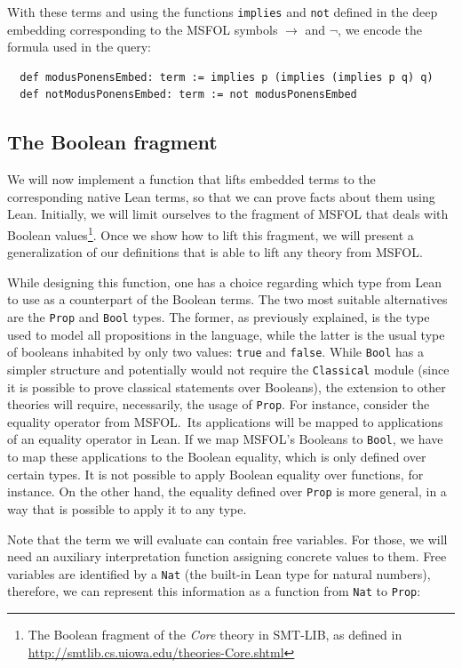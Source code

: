 With these terms and using the functions \texttt{implies} and
\texttt{not} defined in the deep embedding corresponding to the MSFOL symbols
$\rightarrow$ and $\neg$, we encode the formula used in the
query:

\begin{verbatim}
  def modusPonensEmbed: term := implies p (implies (implies p q) q)
  def notModusPonensEmbed: term := not modusPonensEmbed
\end{verbatim}


\subsection{The Boolean fragment}

We will now implement a function that lifts embedded terms to the corresponding
native Lean terms, so that we can prove facts about them using Lean.
Initially, we will limit ourselves to the fragment of MSFOL that
deals with Boolean values\footnote{The Boolean fragment of the
\emph{Core} theory in SMT-LIB, as defined in
\url{http://smtlib.cs.uiowa.edu/theories-Core.shtml}}. Once
we show how to lift this fragment, we will present a generalization
of our definitions that is able to lift any theory from MSFOL.

While designing this function, one has a
choice regarding which type from Lean to use as a counterpart of the Boolean terms. The two
most suitable alternatives are the \texttt{Prop} and \texttt{Bool} types. The former, as
previously explained, is the type used to model all propositions in the language, while
the latter is the usual type of booleans inhabited by only two values: \texttt{true} and
\texttt{false}. While \texttt{Bool} has a simpler structure and potentially would not
require the \texttt{Classical} module (since it is possible to prove classical statements over Booleans),
the extension to other theories will require, necessarily, the usage of \texttt{Prop}. For instance,
consider the equality operator from MSFOL.\ Its applications will be mapped to applications of an equality operator
in Lean. If we map MSFOL's Booleans to \texttt{Bool}, we have to map these applications to the
Boolean equality, which is only defined over certain types. It is not possible
to apply Boolean equality over functions, for instance. On the other hand, the equality
defined over \texttt{Prop} is more general, in a way that is possible to apply it to any type.

Note that the term we will evaluate can contain free variables. For those, we will need an auxiliary interpretation function assigning concrete values to them.
Free variables are
identified by a \texttt{Nat} (the built-in Lean type for natural numbers), therefore, we can
represent this information as a function from \texttt{Nat} to
\texttt{Prop}:


